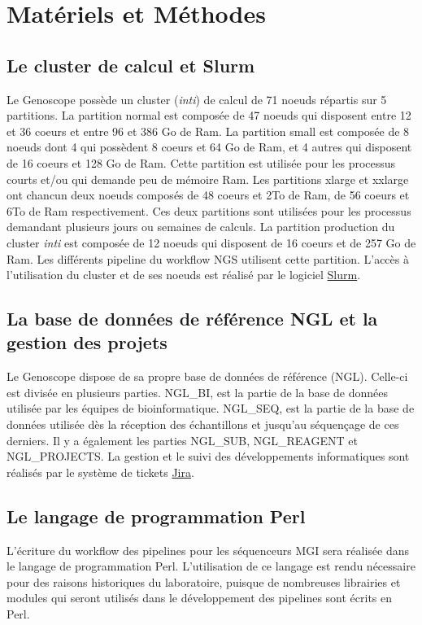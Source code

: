 \section{Matériels et Méthodes}
\subsection{Le cluster de calcul et Slurm}
Le Genoscope possède un cluster (\emph{inti}) de calcul de 71 noeuds répartis sur 5 partitions. La partition \og normal\fg{} est composée de 47 noeuds qui disposent entre 12 et 36 coeurs et entre 96 et 386 Go de Ram. La partition \og small\fg{} est composée de 8 noeuds dont 4 qui possèdent 8 coeurs et 64 Go de Ram, et 4 autres qui disposent de 16 coeurs et 128 Go de Ram. Cette partition est utilisée pour les processus courts et/ou qui demande peu de mémoire Ram. Les partitions \og xlarge \fg{} et \og xxlarge\fg{} ont chancun deux noeuds composés de 48 coeurs et 2To de Ram, de 56 coeurs et 6To de Ram respectivement. Ces deux partitions sont utilisées pour les processus demandant plusieurs jours ou semaines de calculs.
La partition \og production\fg{} du cluster \emph{inti} est composée de 12 noeuds qui disposent de 16 coeurs et de 257 Go de Ram. Les différents pipeline du workflow NGS utilisent cette partition.
L'accès à l'utilisation du cluster et de ses noeuds est réalisé par le logiciel \href{https://slurm.schedmd.com/documentation.html}{Slurm}.

\subsection{La base de données de référence NGL et la gestion des projets}
Le Genoscope dispose de sa propre base de données de référence (NGL). Celle-ci est divisée en plusieurs parties. NGL\_BI, est la partie de la base de données utilisée par les équipes de bioinformatique. NGL\_SEQ, est la partie de la base de données utilisée dès la réception des échantillons et jusqu'au séquençage de ces derniers. Il y a également les parties NGL\_SUB, NGL\_REAGENT et NGL\_PROJECTS. La gestion et le suivi des développements informatiques sont réalisés par le système de tickets \href{https://www.atlassian.com/fr/software/jira}{Jira}.

\subsection{Le langage de programmation Perl}
L'écriture du workflow des pipelines pour les séquenceurs MGI sera réalisée dans le langage de programmation Perl. L'utilisation de ce langage est rendu nécessaire pour des raisons historiques du laboratoire, puisque de nombreuses librairies et modules qui seront utilisés dans le développement des pipelines sont écrits en Perl.\\

